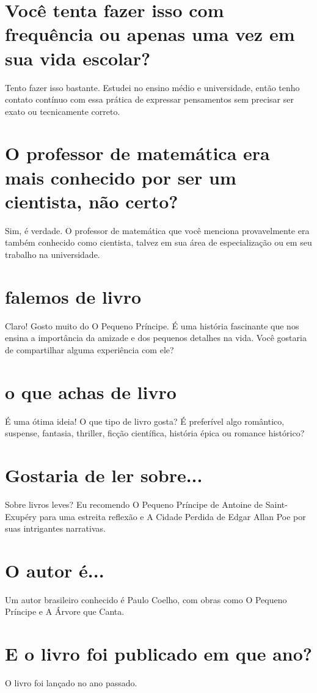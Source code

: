 \documentclass[11pt,a4paper]{article}
\begin{document}
\section{Você tenta fazer isso com frequência ou apenas uma vez em sua vida escolar?}
Tento fazer isso bastante. Estudei no ensino médio e universidade, então tenho contato contínuo com essa prática de expressar pensamentos sem precisar ser exato ou tecnicamente correto.

\section{O professor de matemática era mais conhecido por ser um cientista, não certo?}
Sim, é verdade. O professor de matemática que você menciona provavelmente era também conhecido como cientista, talvez em sua área de especialização ou em seu trabalho na universidade.

\section{falemos de livro}
Claro! Gosto muito do O Pequeno Príncipe. É uma história fascinante que nos ensina a importância da amizade e dos pequenos detalhes na vida. Você gostaria de compartilhar alguma experiência com ele?

\section{o que achas de livro}
É uma ótima ideia! O que tipo de livro gosta? É preferível algo romântico, suspense, fantasia, thriller, ficção científica, história épica ou romance histórico?

\section{Gostaria de ler sobre...}
Sobre livros leves? Eu recomendo O Pequeno Príncipe de Antoine de Saint-Exupéry para uma estreita reflexão e A Cidade Perdida de Edgar Allan Poe por suas intrigantes narrativas.

\section{O autor é...}
Um autor brasileiro conhecido é Paulo Coelho, com obras como O Pequeno Príncipe e A Árvore que Canta.

\section{E o livro foi publicado em que ano?}
O livro foi lançado no ano passado.
\end{document}
